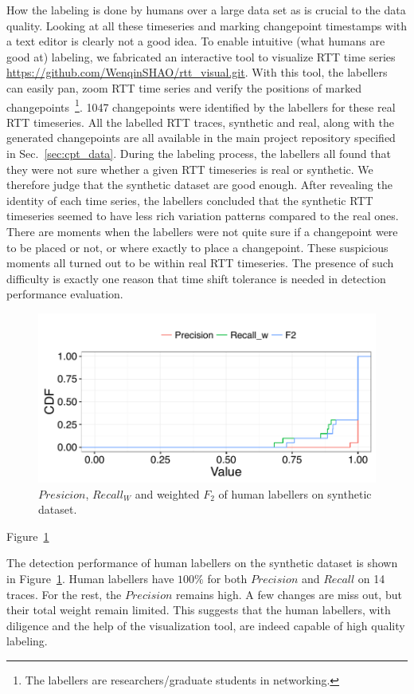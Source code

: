 How the labeling is done by humans over a large data set as is crucial to the data quality.
Looking at all these timeseries and marking changepoint timestamps with a text editor is clearly not a good idea.
To enable intuitive (what humans are good at) labeling, we fabricated an interactive tool to visualize RTT time series \url{https://github.com/WenqinSHAO/rtt_visual.git}.
With this tool, the labellers can easily pan, zoom RTT time series and verify the positions of marked changepoints~\footnote{The labellers are researchers/graduate students in networking.}.
1047 changepoints were identified by the labellers for these real RTT timeseries.
All the labelled RTT traces, synthetic and real, along with the generated changepoints are all available in the main project repository specified in Sec.~\ref{sec:cpt_data}.
During the labeling process, the labellers all found that they were not sure whether a given RTT timeseries is real or synthetic.
We therefore judge that the synthetic dataset are good enough.
After revealing the identity of each time series, the labellers concluded that the synthetic RTT timeseries seemed to have less rich variation patterns compared to the real ones.
There are moments when the labellers were not quite sure if a changepoint were to be placed or not, or where exactly to place a changepoint.
These suspicious moments all turned out to be within real RTT timeseries.
The presence of such difficulty is exactly one reason that time shift tolerance is needed in detection performance evaluation.

\begin{figure}[!htb]
\centering
\includegraphics[width=.72\textwidth]{gfx/chap4/antoine_eval.pdf}
\caption{$Presicion$, $Recall_W$ and weighted $F_2$ of human labellers on synthetic dataset.}
\label{fig:antoine_eval}
\end{figure}
Figure~\ref{fig:antoine_eval}

The detection performance of human labellers on the synthetic dataset is shown in Figure~\ref{fig:antoine_eval}. 
Human labellers have $100\%$ for both $Precision$ and $Recall$ on 14 traces.
For the rest, the $Precision$ remains high. A few changes are miss out, but their total weight remain limited.
This suggests that the human labellers, with diligence and the help of the visualization tool, are indeed capable
of high quality labeling.

